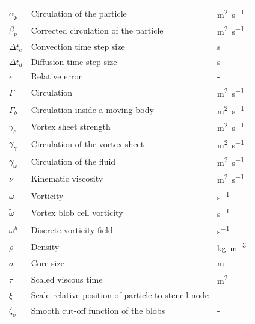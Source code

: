 {\renewcommand{\arraystretch}{1.2} %
\begin{longtable}{p{1.5cm}p{10.5cm}p{1.5cm}}
	$\alpha_p$ 		& Circulation of the particle & \si{m^2.s^{-1}}\\
	$\beta_p$ 		& Corrected circulation of the particle & \si{m^2.s^{-1}}\\	

	$\Delta t_c$ 		& Convection time step size & \si{s}\\
	$\Delta t_d$ 		& Diffusion time step size & \si{s}\\	

	$\epsilon$ 		& Relative error & -\\		

	$\Gamma$ 		& Circulation & \si{m^2.s^{-1}}\\	
	$\Gamma_b$ 		& Circulation inside a moving body & \si{m^2.s^{-1}}\\		
	$\gamma_c$ 		& Vortex sheet strength & \si{m^2.s^{-1}}\\			
	$\gamma_{\gamma}$ 	& Circulation of the vortex sheet & \si{m^2.s^{-1}}\\				
	$\gamma_{\omega}$ 	& Circulation of the fluid & \si{m^2.s^{-1}}\\					

	$\nu$ & Kinematic viscosity & \si{m^2.s^{-1}}\\

	$\omega$ & Vorticity & \si{s^{-1}}\\
	$\tilde{\omega}$ & Vortex blob cell vorticity & \si{s^{-1}}\\
	$\omega^h$ & Discrete vorticity field & \si{s^{-1}}\\

	$\rho$ & Density & \si{kg.m^{-3}}\\
	
	$\sigma$ & Core size & \si{m}\\
	$\tau$ & Scaled viscous time & \si{m^2}\\
	$\xi$ & Scale relative position of particle to stencil node & -\\
	$\zeta_{\sigma}$		& Smooth cut-off function of the blobs & -\\			

\end{longtable}}

